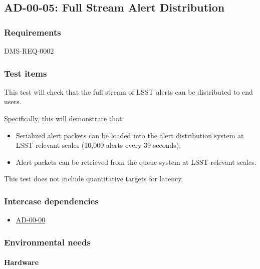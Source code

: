 \subsection{AD-00-05: Full Stream Alert Distribution}
\label{ad-00-05}

\subsubsection{Requirements}

DMS-REQ-0002

\subsubsection{Test items}
\label{ad-00-05-items}

This test will check that the full stream of LSST alerts can be distributed to end users.

Specifically, this will demonstrate that:

\begin{itemize}

	\item{Serialized alert packets can be loaded into the alert distribution system at LSST-relevant scales (10,000 alerts every 39 seconds);}
  \item{Alert packets can be retrieved from the queue system at LSST-relevant scales.}

\end{itemize}

This test does not include quantitative targets for latency.

\subsubsection{Intercase dependencies}

\begin{itemize}

  \item{\hyperref[ad-00-00]{AD-00-00}}

\end{itemize}

\subsubsection{Environmental needs}

\paragraph{Hardware}


